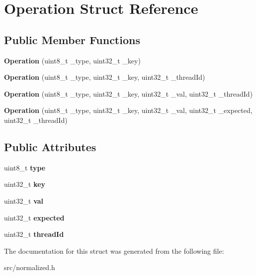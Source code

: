 \hypertarget{structOperation}{}\section{Operation Struct Reference}
\label{structOperation}
\subsection*{Public Member Functions}
\begin{DoxyCompactItemize}
\item 
\mbox{\label{structOperation_aa57ca43909f8df3856bba9bc31935e7b}} 
{\bfseries Operation} (uint8\+\_\+t \+\_\+type, uint32\+\_\+t \+\_\+key)
\item 
\mbox{\label{structOperation_a27604b3f26875e7a8ca131ff4276d54f}} 
{\bfseries Operation} (uint8\+\_\+t \+\_\+type, uint32\+\_\+t \+\_\+key, uint32\+\_\+t \+\_\+thread\+Id)
\item 
\mbox{\label{structOperation_a4ae9d3d528beffcfedc28c9ddfe2d6e8}} 
{\bfseries Operation} (uint8\+\_\+t \+\_\+type, uint32\+\_\+t \+\_\+key, uint32\+\_\+t \+\_\+val, uint32\+\_\+t \+\_\+thread\+Id)
\item 
\mbox{\label{structOperation_a6656a5801de65baf0c093ec72b0074f3}} 
{\bfseries Operation} (uint8\+\_\+t \+\_\+type, uint32\+\_\+t \+\_\+key, uint32\+\_\+t \+\_\+val, uint32\+\_\+t \+\_\+expected, uint32\+\_\+t \+\_\+thread\+Id)
\end{DoxyCompactItemize}
\subsection*{Public Attributes}
\begin{DoxyCompactItemize}
\item 
\mbox{\label{structOperation_af3a68dd33a876c13bf4f28d84fe54b58}} 
uint8\+\_\+t {\bfseries type}
\item 
\mbox{\label{structOperation_aedbef11abb953b5babbd144a990f05e9}} 
uint32\+\_\+t {\bfseries key}
\item 
\mbox{\label{structOperation_a22763c0305dd4dccacc96a17bec59d92}} 
uint32\+\_\+t {\bfseries val}
\item 
\mbox{\label{structOperation_a5e4a30f78a837f0481482119597dd51a}} 
uint32\+\_\+t {\bfseries expected}
\item 
\mbox{\label{structOperation_abe0bd08a0a163bb2a854e1a2d060cda9}} 
uint32\+\_\+t {\bfseries thread\+Id}
\end{DoxyCompactItemize}


The documentation for this struct was generated from the following file\+:\begin{DoxyCompactItemize}
\item 
src/normalized.\+h\end{DoxyCompactItemize}
